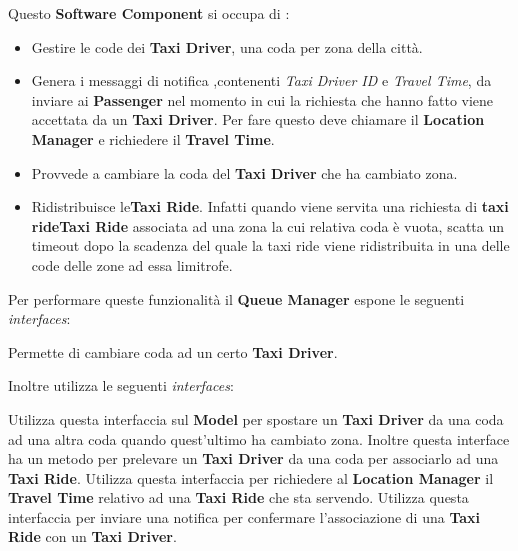 \begin{itemize}
\begin{itemize}
		 Questo \textbf{Software Component} si occupa di :
		\begin{itemize}
			\item Gestire le code dei \textbf{Taxi Driver}, una coda per zona della città.
			\item Genera i messaggi di notifica ,contenenti \textit{Taxi Driver ID} e \textit{Travel Time}, da inviare ai \textbf{Passenger} nel momento in cui la richiesta che hanno fatto viene accettata da un \textbf{Taxi Driver}. 
			Per fare questo deve chiamare il \textbf{Location Manager} e richiedere il \textbf{Travel Time}.
			\item Provvede a cambiare la coda del \textbf{Taxi Driver} che ha cambiato zona.
			\item Ridistribuisce le\textbf{Taxi Ride}. Infatti quando viene servita una richiesta di \textbf{taxi rideTaxi Ride} associata ad una zona la cui relativa coda è vuota, scatta un timeout dopo la scadenza del quale la taxi ride viene ridistribuita in una delle code delle zone ad essa limitrofe.
		\end{itemize}
		Per performare queste funzionalità il \textbf{Queue Manager} espone le seguenti \textit{interfaces}:
		\begin{itemize}
			 Permette di cambiare coda ad un certo \textbf{Taxi Driver}.
		\end{itemize}
		Inoltre utilizza le seguenti \textit{interfaces}:
		\begin{itemize}
			 Utilizza questa interfaccia sul \textbf{Model} per spostare un \textbf{Taxi Driver} da una coda ad una altra coda quando quest'ultimo ha cambiato zona. 
			Inoltre questa interface ha un metodo per prelevare un \textbf{Taxi Driver} da una coda per associarlo ad una \textbf{Taxi Ride}.
			 Utilizza questa interfaccia per richiedere al \textbf{Location Manager} il \textbf{Travel Time} relativo ad una \textbf{Taxi Ride} che sta servendo.
			 Utilizza questa interfaccia per inviare una notifica per confermare l'associazione di una \textbf{Taxi Ride} con un \textbf{Taxi Driver}.
		\end{itemize}
		

\end{itemize}
\end{itemize}
